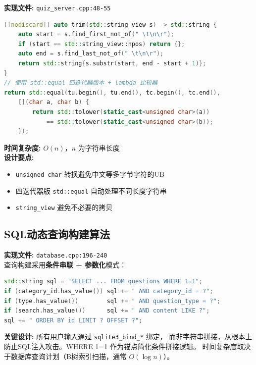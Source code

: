 \documentclass[12pt,a4paper]{ctexart}
\begin{document}
\begin{algobox}
\textbf{实现文件:} \texttt{quiz\_server.cpp:48-55}\\[4pt]
\begin{lstlisting}[language=C++,basicstyle=\ttfamily\small]
[[nodiscard]] auto trim(std::string_view s) -> std::string {
    auto start = s.find_first_not_of(" \t\n\r");
    if (start == std::string_view::npos) return {};
    auto end = s.find_last_not_of(" \t\n\r");
    return std::string{s.substr(start, end - start + 1)};
}
// 使用 std::equal 四迭代器版本 + lambda 比较器
return std::equal(tu.begin(), tu.end(), tc.begin(), tc.end(),
    [](char a, char b) {
        return std::tolower(static_cast<unsigned char>(a))
            == std::tolower(static_cast<unsigned char>(b));
    });
\end{lstlisting}

\textbf{时间复杂度:} $O(n)$，$n$ 为字符串长度\\
\textbf{设计要点:}
\begin{itemize}[nosep]
    \item \texttt{unsigned char} 转换避免中文等多字节字符的UB
    \item 四迭代器版 \texttt{std::equal} 自动处理不同长度字符串
    \item \texttt{string\_view} 避免不必要的拷贝
\end{itemize}
\end{algobox}

\subsection{SQL动态查询构建算法}

\begin{algobox}
\textbf{实现文件:} \texttt{database.cpp:196-240}\\[4pt]
查询构建采用\textbf{条件串联 + 参数化}模式：
\begin{lstlisting}[language=C++,basicstyle=\ttfamily\small]
std::string sql = "SELECT ... FROM questions WHERE 1=1";
if (category_id.has_value()) sql += " AND category_id = ?";
if (type.has_value())        sql += " AND question_type = ?";
if (search.has_value())      sql += " AND content LIKE ?";
sql += " ORDER BY id LIMIT ? OFFSET ?";
\end{lstlisting}

\textbf{关键设计:} 所有用户输入通过 \texttt{sqlite3\_bind\_*} 绑定，
而非字符串拼接，从根本上防止SQL注入攻击。WHERE 1=1 作为锚点简化条件拼接逻辑。
时间复杂度取决于数据库查询计划（B树索引扫描，通常 $O(\log n)$）。
\end{algobox}
\end{document}
